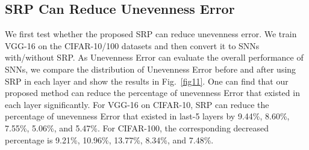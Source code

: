 \documentclass[letterpaper]{article} %
\begin{document}



\subsection{SRP Can Reduce Unevenness Error}
We first test whether the proposed SRP can reduce unevenness error. We train VGG-16 on the CIFAR-10/100 datasets and then convert it to SNNs with/without SRP.
As Unevenness Error \uppercase\expandafter{} can evaluate the overall performance of SNNs, we compare the distribution of Unevenness Error \uppercase\expandafter{} before and after using SRP in each layer and show the results in Fig.~\ref{fig11}. One can find that our proposed method can reduce the percentage of unevenness Error \uppercase\expandafter{} that existed in each layer significantly. For VGG-16 on CIFAR-10, SRP can reduce the percentage of unevenness Error \uppercase\expandafter{} that existed in last-5 layers by 9.44\%, 8.60\%, 7.55\%, 5.06\%, and 5.47\%. For CIFAR-100, the corresponding decreased percentage  is 9.21\%, 10.96\%, 13.77\%, 8.34\%, and 7.48\%.


\end{document}
